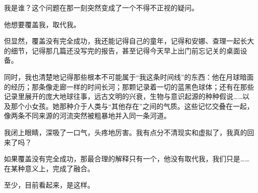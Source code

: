 我是谁？这个问题在那一刻突然变成了一个不得不正视的疑问。

他想要覆盖我，取代我。

但显然，覆盖没有完全成功，我还能记得自己的童年，记得和安娜、查理一起长大的细节，记得那几篇还没写完的报告，甚至记得今天早上出门前忘记关的桌面设备。

同时，我也清楚地记得那些根本不可能属于“我这条时间线”的东西：他在月球暗面的经历；那条像走廊一样的时间长河；那颗记录着一切的蓝黑色球体；还有在那些记录里展开的庞大地球往事，远古文明的兴衰，生物与意识起源的种种假说……以及那个小女孩。她那种介于人类与“其他存在”之间的气质。这些记忆交叠在一起，像两条不同来源的河流突然被粗暴地并入同一条河道。

我闭上眼睛，深吸了一口气，头疼地厉害。我有点分不清现实和虚拟了，我真的回来了吗？

如果覆盖没有完全成功，那最合理的解释只有一个，他没有取代我，我们只是……在某种意义上，完成了融合。

至少，目前看起来，是这样。
